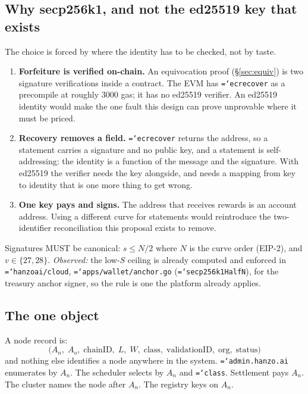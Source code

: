 \documentclass[11pt,a4paper]{article}
\newcommand{\code}[1]{\texttt{\hyphenchar\font=`\-\relax #1}}
\begin{document}
\subsection{Why secp256k1, and not the ed25519 key that exists}
\label{sec:curve}

The choice is forced by where the identity has to be checked, not by taste.

\begin{enumerate}[label=(\roman*)]
\item \textbf{Forfeiture is verified on-chain.} An equivocation proof
  (\S\ref{sec:equiv}) is two signature verifications inside a contract. The EVM
  has \code{ecrecover} as a precompile at roughly 3000 gas; it has no ed25519
  verifier. An ed25519 identity would make the one fault this design can prove
  unprovable where it must be priced.
\item \textbf{Recovery removes a field.} \code{ecrecover} returns the address, so
  a statement carries a signature and no public key, and a statement is
  self-addressing: the identity is a function of the message and the signature.
  With ed25519 the verifier needs the key alongside, and needs a mapping from key
  to identity that is one more thing to get wrong.
\item \textbf{One key pays and signs.} The address that receives rewards is an
  account address. Using a different curve for statements would reintroduce the
  two-identifier reconciliation this proposal exists to remove.
\end{enumerate}

Signatures MUST be canonical: $s \le N/2$ where $N$ is the curve order (EIP-2),
and $v \in \{27, 28\}$. \emph{Observed:} the low-$S$ ceiling is already computed
and enforced in \code{hanzoai/cloud}, \code{apps/wallet/anchor.go}
(\code{secp256k1HalfN}), for the treasury anchor signer, so the rule is one the
platform already applies.

\subsection{The one object}

A node record is:
\[
  \bigl(A_n,\; A_o,\; \text{chainID},\; L,\; W,\; \text{class},\;
  \text{validationID},\; \text{org},\; \text{status}\bigr)
\]
and nothing else identifies a node anywhere in the system. \code{admin.hanzo.ai}
enumerates by $A_n$. The scheduler selects by $A_n$ and \code{class}. Settlement
pays $A_n$. The cluster names the node after $A_n$. The registry keys on $A_n$.
\end{document}
